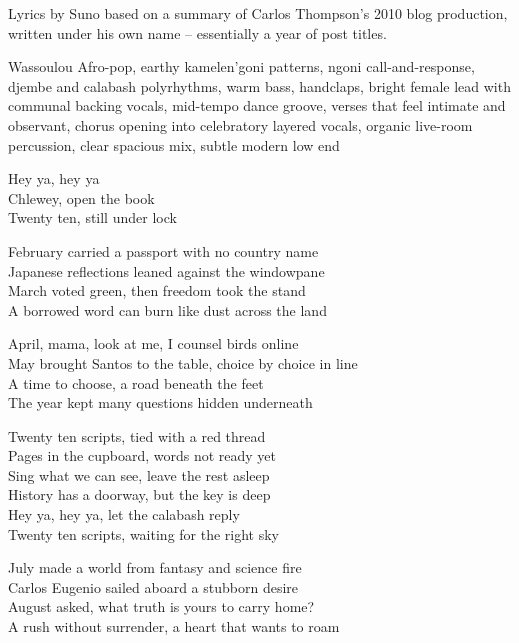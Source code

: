 
\begin{notes}
Lyrics by Suno based on a summary of Carlos Thompson's 2010 blog production, written under his own name -- essentially a year of post titles.
\end{notes}
\begin{style}
Wassoulou Afro-pop, earthy kamelen’goni patterns, ngoni call-and-response, djembe and calabash polyrhythms, warm bass, handclaps, bright female lead with communal backing vocals, mid-tempo dance groove, verses that feel intimate and observant, chorus opening into celebratory layered vocals, organic live-room percussion, clear spacious mix, subtle modern low end
\end{style}
\begin{lyrics}
Hey ya, hey ya\\
Chlewey, open the book\\
Twenty ten, still under lock

February carried a passport with no country name\\
Japanese reflections leaned against the windowpane\\
March voted green, then freedom took the stand\\
A borrowed word can burn like dust across the land

April, mama, look at me, I counsel birds online\\
May brought Santos to the table, choice by choice in line\\
A time to choose, a road beneath the feet\\
The year kept many questions hidden underneath

Twenty ten scripts, tied with a red thread\\
Pages in the cupboard, words not ready yet\\
Sing what we can see, leave the rest asleep\\
History has a doorway, but the key is deep\\
Hey ya, hey ya, let the calabash reply\\
Twenty ten scripts, waiting for the right sky

July made a world from fantasy and science fire\\
Carlos Eugenio sailed aboard a stubborn desire\\
August asked, what truth is yours to carry home?\\
A rush without surrender, a heart that wants to roam


\end{lyrics}
